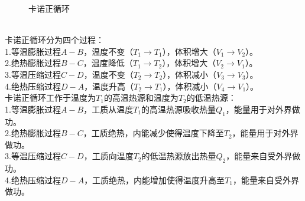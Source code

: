 \documentclass[UTF8]{ctexart}
\begin{document}
\begin{figure}[h]
\begin{center}
            \caption{卡诺正循环}
        \end{center}
    \end{figure}\\
    卡诺正循环分为四个过程：\\[3mm]
    1.等温膨胀过程$A-B$，温度不变（$T_1\rightarrow T_1$），体积增大（$V_1\rightarrow V_2$）。\\[3mm]
    2.绝热膨胀过程$B-C$，温度降低（$T_1\rightarrow T_2$），体积增大（$V_2\rightarrow V_1$）。\\[3mm]
    3.等温压缩过程$C-D$，温度不变（$T_2\rightarrow T_2$），体积减小（$V_3\rightarrow V_3$）。\\[3mm]
    4.绝热压缩过程$D-A$\hspace{0.4pt}，温度升高（$T_2\rightarrow T_1$），体积减小（$V_4\rightarrow V_1$）。\\[6mm]
    卡诺正循环工作于温度为$T_1$的高温热源和温度为$T_2$的低温热源：\\[3mm]
    1.等温膨胀过程$A-B$，工质从温度\hspace{4pt}$T_1$\hspace{4pt}的高温热源吸收热量$Q_1$，能量用于对外界做功。\\[3mm]
    2.绝热膨胀过程$B-C$，工质绝热，内能减少使得温度下降至$T_2$，能量用于对外界做功。\\[3mm]
    3.等温压缩过程$C-D$，工质向温度\hspace{4pt}$T_2$\hspace{4pt}的低温热源放出热量$Q_2$，能量来自受外界做功。\\[3mm]
    4.绝热压缩过程$D-A$\hspace{0.4pt}，工质绝热，内能增加使得温度升高至$T_1$，能量来自受外界做功。\\[5mm]

\newpage
\end{document}
